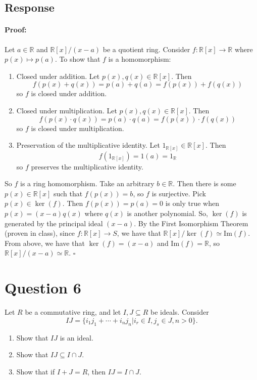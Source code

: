 \documentclass [12pt] {article}
\newcommand{\R}{\mathbb{R}}
\newenvironment{proof}{\paragraph{Proof:}}{\hfill$\square$}
\renewcommand{\Im}{\text{Im}}
\begin{document}
\subsection*{Response}
\begin{proof}
    Let $a \in \R$ and $\R[x]/(x - a)$ be a quotient ring. Consider $f : \R[x] \to \R$ where
    $p(x) \mapsto p(a)$. To show that $f$ is a homomorphism:
    \begin{enumerate}
        \item Closed under addition. Let $p(x), q(x) \in \R[x]$. Then
            \[f(p(x) + q(x)) = p(a) + q(a) = f(p(x)) + f(q(x))\]
            so $f$ is closed under addition.
        \item Closed under multiplication. Let $p(x), q(x) \in \R[x]$. Then
            \[f(p(x) \cdot q(x)) = p(a) \cdot q(a) = f(p(x)) \cdot f(q(x))\]
            so $f$ is closed under multiplication.
        \item Preservation of the multiplicative identity. Let $1_{\R[x]} \in \R[x]$. Then
            \[f(1_{\R[x]}) = 1(a) = 1_{\R}\]
            so $f$ preserves the multiplicative identity.
    \end{enumerate}
    So $f$ is a ring homomorphism. Take an arbitrary $b \in \R$. Then there is some $p(x) \in \R[x]$ 
    such that $f(p(x)) = b$, so $f$ is surjective. Pick $p(x) \in \ker(f)$. Then $f(p(x)) = p(a) = 0$ 
    is only true when $p(x) = (x - a)q(x)$ where $q(x)$ is another polynomial. So, $\ker(f)$ is 
    generated by the principal ideal $(x - a)$. By the First Isomorphism Theorem (proven in class),
    since $f : \R[x] \to S$, we have that $\R[x]/\ker(f) \simeq \Im(f)$. From above, we have that
    $\ker(f) = (x - a)$ and $\Im(f) = \R$, so $\R[x]/(x - a) \simeq \R$.
\end{proof}
\newpage

\section*{Question 6}
Let $R$ be a commutative ring, and let $I,J\subseteq R$ be ideals. Consider $$IJ=\{i_1j_1+\cdots + i_nj_n|i_r\in I, j_s\in J, n>0\}.$$

\begin{enumerate}
    \item Show that $IJ$ is an ideal. 
    \item Show that $IJ\subseteq I\cap J$. 
    \item Show that if $I+J=R$, then $IJ=I\cap J$.
\end{enumerate}
\end{document}
